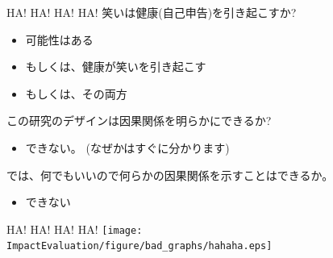\begin{frame}{HA! HA! HA! HA!}
笑いは健康(自己申告)を引き起こすか?
\begin{itemize}[<+->]
\vspace{1.0ex}\setlength{\itemsep}{1.0ex}\setlength{\baselineskip}{12pt}
\item	可能性はある%
\item	もしくは、健康が笑いを引き起こす%
\item	もしくは、その両方%
\end{itemize}

\pause
\vspace{2ex}
この研究のデザインは因果関係を明らかにできるか?
\begin{itemize}
\vspace{1.0ex}\setlength{\itemsep}{1.0ex}\setlength{\baselineskip}{12pt}
\pause \item	できない。%
\pause (なぜかはすぐに分かります)%
\end{itemize}

\vspace{2ex}
\pause %
では、何でもいいので何らかの因果関係を示すことはできるか。
\begin{itemize}
\vspace{1.0ex}\setlength{\itemsep}{1.0ex}\setlength{\baselineskip}{12pt}
\pause \item	できない %
\end{itemize}
\end{frame}

\begin{frame}{HA! HA! HA! HA!}
\hfil\texttt{[image: ImpactEvaluation/figure/bad\_graphs/hahaha.eps]}
\end{frame}


